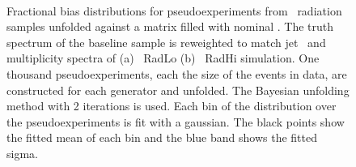 \begin{figure}
~
\label{fig:radbias}
\caption{
Fractional bias distributions for pseudoexperiments from \madpy\ radiation samples unfolded against a matrix filled with nominal \madpy. The truth spectrum of the baseline sample is reweighted to match jet \pt\ and multiplicity spectra of (a) \madpy\ RadLo (b) \madpy\ RadHi simulation. One thousand pseudoexperiments, each the size of the events in data, are constructed for each generator and unfolded. The Bayesian unfolding method with 2 iterations is used. Each bin of the distribution over the pseudoexperiments is fit with a gaussian. The black points show the fitted mean of each bin and the blue band shows the fitted sigma.}
\end{figure}


